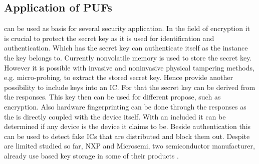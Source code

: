 
\subsection{Application of PUFs}
\label{sec:applicationsofpufs}

\pufs can be used as basis for several security application.
In the field of encryption it is crucial to protect the secret key as it is used for identification and authentication.
Which has the secret key can authenticate itself as the instance the key belongs to.
Currently nonvolatile memory is used to store the secret key.
However it is possible with invasive and noninvasive physical tampering methods, e.g. micro-probing, to extract the stored secret key. %
Hence \pufs provide another possibility to include keys into an \ac{IC}.
For that the secret key can be derived from the \puf responses.
This key then can be used for different propose, such as encryption. %
Also hardware fingerprinting can be done through the \puf responses as the \puf is directly coupled with the device itself.
With an included \puf it can be determined if any device is the device it claims to be.
Beside authentication this can be used to detect fake \acp{IC} that are distributed and block them out. %
Despite \puf are limited studied so far, \acl{NXP} and Microsemi, two semiconductor manufacturer, already use \puf based key storage in some of their products \cite{Becker2015ThePUFs}.

